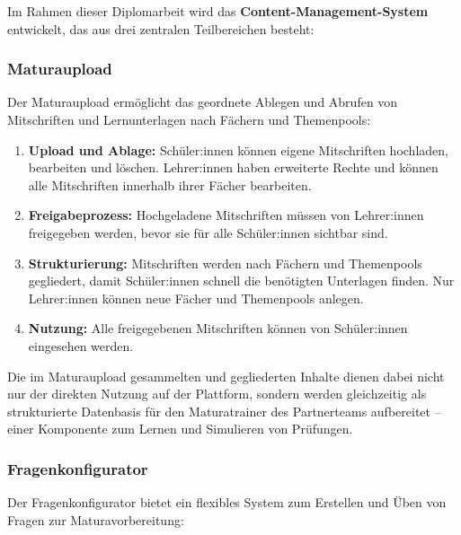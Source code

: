 Im Rahmen dieser Diplomarbeit wird das \textbf{Content-Management-System}
entwickelt, das aus drei zentralen Teilbereichen besteht:

\subsubsection{Maturaupload}

Der Maturaupload ermöglicht das geordnete Ablegen und Abrufen von Mitschriften
und Lernunterlagen nach Fächern und Themenpools:

\begin{enumerate}
    \item \textbf{Upload und Ablage:} Schüler:innen können eigene Mitschriften
    hochladen, bearbeiten und löschen. Lehrer:innen haben erweiterte Rechte
    und können alle Mitschriften innerhalb ihrer Fächer bearbeiten.

    \item \textbf{Freigabeprozess:} Hochgeladene Mitschriften müssen von
    Lehrer:innen freigegeben werden, bevor sie für alle Schüler:innen
    sichtbar sind.

    \item \textbf{Strukturierung:} Mitschriften werden nach Fächern und
    Themenpools gegliedert, damit Schüler:innen schnell die benötigten
    Unterlagen finden. Nur Lehrer:innen können neue Fächer und Themenpools
    anlegen.

    \item \textbf{Nutzung:} Alle freigegebenen Mitschriften können von
    Schüler:innen eingesehen werden.
\end{enumerate}

Die im Maturaupload gesammelten und gegliederten Inhalte dienen dabei nicht
nur der direkten Nutzung auf der Plattform, sondern werden gleichzeitig als
strukturierte Datenbasis für den Maturatrainer des Partnerteams aufbereitet --
einer Komponente zum Lernen und Simulieren von Prüfungen.

\subsubsection{Fragenkonfigurator}

Der Fragenkonfigurator bietet ein flexibles System zum Erstellen und Üben von
Fragen zur Maturavorbereitung:

